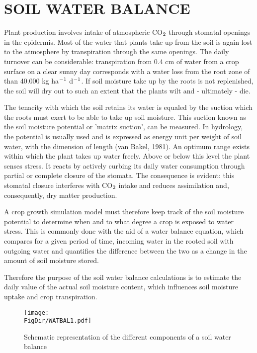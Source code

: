\chapter{SOIL WATER BALANCE}

Plant production involves intake of atmospheric CO$_{{\rm 2}}$ through stomatal openings in the
epidermis. Most of the water that plants take up from the soil is again lost to the
atmosphere by transpiration through the same openings. The daily turnover can be
considerable: transpiration from 0.4 cm of water from a crop surface on a clear sunny
day corresponds with a water loss from the root zone of than 40.000 kg ha$^{{\rm -1}}$ 
d$^{{\rm -1}}$. If soil
moisture take up by the roots is not replenished, the soil will dry out to such an extent
that the plants wilt and - ultimately - die.

The tenacity with which the soil retains its water is equaled by the suction which the
roots must exert to be able to take up soil moisture. This suction known as the soil
moisture potential or 'matrix suction', can be measured. In hydrology, the potential is
usually used and is expressed as energy unit per weight of soil water, with the dimension
of length (van Bakel, 1981). An optimum range exists within which the plant takes up
water freely. Above or below this level the plant senses stress. It reacts by actively
curbing its daily water consumption through partial or complete closure of the stomata.
The consequence is evident: this stomatal closure interferes with CO$_{{\rm 2}}$ intake and 
reduces assimilation and, consequently, dry matter production.

A crop growth simulation model must therefore keep track of the soil moisture potential
to determine when and to what degree a crop is exposed to water stress. This is common\-ly 
done with the aid of a water balance equation, which compares for a given period of
time, incoming water in the rooted soil with outgoing water and quantifies the difference
between the two as a change in the amount of soil moisture stored.

Therefore the purpose of the soil water balance calculations is to estimate the daily value
of the actual soil moisture content, which influences soil moisture uptake and crop
transpiration.

\begin{figure}[p]
\centering
\texttt{[image: \\FigDir/WATBAL1.pdf]}
\caption{Sche\-matic repre\-senta\-tion of the differ\-ent compo\-nents of a soil water balance}
\label{fig:WatBalSchematic}
\end{figure}

